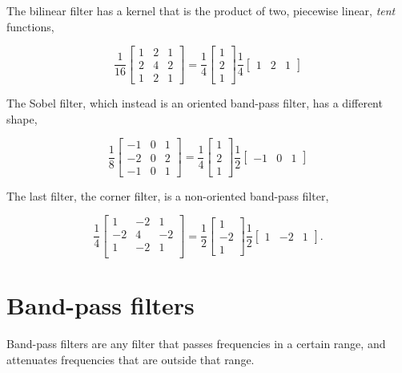 \documentclass[10pt]{report}
\begin{document}
The bilinear filter has a kernel that is the product of two, piecewise
linear, \emph{tent} functions,

\[\frac{1}{16} \begin{bmatrix} 1 & 2 & 1\\ 2 & 4 & 2\\ 1 & 2 & 1 \end{bmatrix} = \frac{1}{4}\begin{bmatrix} 1 \\ 2 \\ 1 \end{bmatrix} \frac{1}{4} \begin{bmatrix} 1 & 2 & 1 \end{bmatrix} \]

The Sobel filter, which instead is an oriented band-pass filter, has a
different shape,

\[ \frac{1}{8} \begin{bmatrix} -1 & 0 & 1 \\ -2 & 0 & 2 \\ -1 & 0 & 1 \end{bmatrix} = \frac{1}{4} \begin{bmatrix} 1 \\ 2 \\ 1 \end{bmatrix} \frac{1}{2} \begin{bmatrix} -1 & 0 & 1 \end{bmatrix} \]

The last filter, the corner filter, is a non-oriented band-pass filter,

\[ \frac{1}{4} \begin{bmatrix} 1 & -2 & 1\\ -2 & 4 & -2\\ 1 & -2 & 1\\ \end{bmatrix} = \frac{1}{2} \begin{bmatrix} 1 \\ -2 \\ 1 \end{bmatrix} \frac{1}{2} \begin{bmatrix} 1 & -2 & 1 \end{bmatrix}. \]

\section{Band-pass filters}
\label{band-pass-filters}
Band-pass filters are any filter that passes frequencies in a certain
range, and attenuates frequencies that are outside that range.
\end{document}
